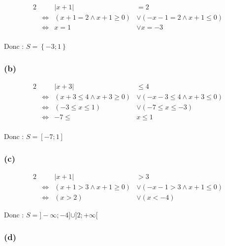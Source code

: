 \documentclass{report}
\begin{document}
\begin{alignat*}{2}
&                    & |x+1| &=2 \\
&\Longleftrightarrow &(x+1=2 \wedge x+1 \geq 0) &\vee (-x-1=2 \wedge x+1 \leq 0) \\
&\Longleftrightarrow & x=1 &\vee x=-3 \\
\end{alignat*}

Donc : $S=\left\lbrace -3 ; 1 \right\rbrace$

\subsubsection*{(b)}

\begin{alignat*}{2}
	&                    & |x+3| &\leq 4 \\
	&\Longleftrightarrow &(x+3\leq 4 \wedge x+3 \geq 0) &\vee (-x-3\leq 4 \wedge x+3 \leq 0) \\
	&\Longleftrightarrow & (-3 \leq x \leq 1) &\vee (-7 \leq x \leq -3) \\
	&\Longleftrightarrow & -7 \leq &x \leq 1 \\
\end{alignat*}

Donc : $S=[-7 ; 1]$

\subsubsection*{(c)}

\begin{alignat*}{2}
	&                    & |x+1| &>3  \\
	&\Longleftrightarrow &(x+1 > 3 \wedge x+1 \geq 0) &\vee (-x-1 >3 \wedge x+1 \leq 0) \\
	&\Longleftrightarrow & (x > 2) &\vee (x < -4)
\end{alignat*}

Donc : $S=]-\infty ; -4] \cup ]2 ; +\infty[$

\subsubsection*{(d)}

\end{document}
